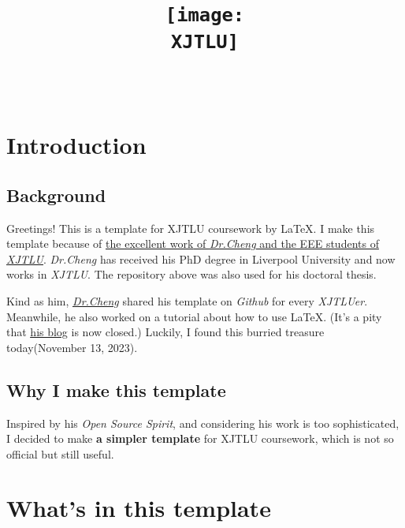 \documentclass{article}
\title{
    \texttt{[image: \\XJTLU]}\\
    \vspace{1cm}
    \moduleName
    }
\author{
    \authorName \\
    \authorID
    }
\date{\reportDate}
\begin{document}
\maketitle

\vspace{2cm}

\newpage
\tableofcontents

\newpage
\section{Introduction}
\subsection{Background}
Greetings! This is a template for XJTLU coursework by \LaTeX. \cite{example1}
I make this template because of \href{https://github.com/feimax/latex_template_for_xjtlu_eee_light}{\underline{the excellent work} of \textit{Dr.Cheng} and the EEE students of \textit{XJTLU}}. 
\textit{Dr.Cheng} has received his PhD degree in Liverpool University and now works in \textit{XJTLU}. 
The repository above was also used for his doctoral thesis.\cite{example2}\par
Kind as him, \href{https://www.xjtlu.edu.cn/en/study/departments/school-of-advanced-technology/communications-and-networking/department-staff/academic-staff/staff/fei-cheng}{\textit{\underline{Dr.Cheng}}} shared his template on \textit{Github} for every \textit{XJTLUer}. 
Meanwhile, he also worked on a tutorial about how to use \LaTeX. (It's a pity that \href{http://blog.feieee.com/latex}{\underline{his blog}} is now closed.)
Luckily, I found this burried treasure today(November 13, 2023).\par

\subsection{Why I make this template}
Inspired by his \textit{Open Source Spirit}, and considering his work is too sophisticated, I decided to make \textbf{a simpler template} for XJTLU coursework, 
which is not so official but still useful.

\newpage
\section{What's in this template}
\end{document}
